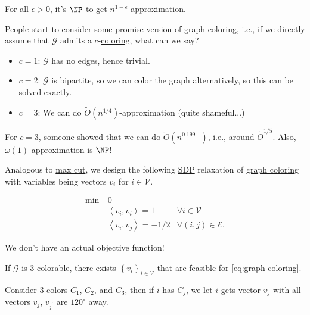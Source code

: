 \begin{theorem}
	For all \(\epsilon > 0\), it's \(\NP\) to get \(n^{1 - \epsilon }\)-approximation.
\end{theorem}

People start to consider some promise version of \hyperref[prb:graph-coloring]{graph coloring}, i.e., if we directly assume that \(\mathcal{G} \) admits a \(c\)-\hyperref[def:coloring]{coloring}, what can we say?
\begin{itemize}
	\item \(c = 1\): \(\mathcal{G} \) has no edges, hence trivial.
	\item \(c = 2\): \(\mathcal{G} \) is bipartite, so we can color the graph alternatively, so this can be solved exactly.
	\item \(c = 3\): We can do \(\widetilde{O} (n^{1 / 4})\)-approximation (quite shameful...)
\end{itemize}
\begin{remark}[SOTA for \(c=3\)]
	For \(c = 3\), someone showed that we can do \(\widetilde{O} (n^{0.199\dots  })\), i.e., around \(\widetilde{O} ^{1 / 5}\). Also, \(\omega (1)\)-approximation is \(\NP\)!
\end{remark}

Analogous to \hyperref[prb:max-cut]{max cut}, we design the following \hyperref[eq:graph-coloring]{SDP} relaxation of \hyperref[prb:graph-coloring]{graph coloring} with variables being vectors \(v_i\) for \(i\in \mathcal{V} \).

\begin{equation}\label{eq:graph-coloring}
	\begin{aligned}
		\min~ & 0                                                                             \\
		      & \left\langle v_i, v_i \right\rangle = 1      & \forall i\in \mathcal{V}       \\
		      & \left\langle v_i, v_j \right\rangle = -1 / 2 & \forall (i, j)\in \mathcal{E}.
	\end{aligned}
\end{equation}

\begin{note}
	We don't have an actual objective function!
\end{note}

\begin{claim}
	If \(\mathcal{G} \) is \(3\)-\hyperref[def:coloring]{colorable}, there exists \(\left\{ v_i \right\}_{i\in \mathcal{V} } \) that are feasible for \autoref{eq:graph-coloring}.
\end{claim}
\begin{explanation}
	Consider \(3\) colors \(C_1\), \(C_2\), and \(C_3\), then if \(i\) has \(C_j\), we let \(i\) gets vector \(v_j\) with all vectors \(v_j\), \(v_{j^\prime }\) are \(120^{\circ } \) away.
	\begin{center}
	\end{center}
\end{explanation}


